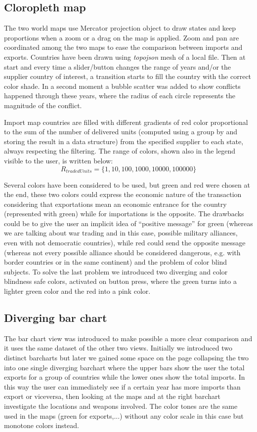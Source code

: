 \documentclass{article}
\begin{document}
\begin{multicols}{2}
\subsection{Cloropleth map}
The two world maps use Mercator projection object to draw states and keep proportions when a zoom or a drag on the map is applied. Zoom and pan are coordinated among the two maps to ease the comparison between imports and exports. Countries have been drawn using \textit{topojson} mesh of a local file. Then at start and every time a slider/button changes the range of years and/or the supplier country of interest, a transition starts to fill the country with the correct color shade. In a second moment a bubble scatter was added to show conflicts happened through these years, where the radius of each circle represents the magnitude of the conflict.  

Import map countries are filled with different gradients of red  color proportional to the sum of the number of delivered units (computed using a group by and storing the result in a data structure) from the specified supplier to each state, always respecting the filtering. The range of colors, shown also in the legend visible to the user, is written below:
$$R_{tradedUnits}=\{1,10,100,1000,10000,100000\}$$

Several colors have been considered to be used, but green and red were chosen at the end, these two colors could express the economic nature of the transaction considering that exportations mean an economic entrance for the country (represented with green) while for importations is the opposite.
The drawbacks could be to give the user an implicit idea of “positive message” for green (whereas we are talking about war trading and in this case, possible military alliances, even with not democratic countries), while red could send the opposite message (whereas not every possible alliance should be considered dangerous, e.g. with border countries or in the same continent) and the problem of color blind subjects. To solve the last problem we introduced two diverging and color blindness safe colors, activated on button press, where the green turns into a lighter green color and the red into a pink color.


\subsection{Diverging bar chart}

The bar chart view was introduced to make possible a more clear comparison and it uses the same dataset of the other two views. Initially we introduced two distinct barcharts but later we gained some space on the page collapsing the two into one single diverging barchart where the upper bars show the user the total exports for a group of countries while the lower ones show the total imports. In this way the user can immediately see  if a certain year has more imports than export or viceversa, then looking at the maps and at the right barchart investigate the locations and weapons involved. The color tones are the same used in the maps (green for exports,...) without any color scale in this case but monotone colors instead.  


\end{multicols}
\end{document}
